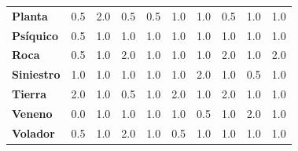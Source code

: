 \documentclass[oneside,11pt]{Latex/Classes/PhDthesisPSnPDF}
\begin{document}
\begin{table}[!h]
{\begin{tabular}[t]{>{}lrrrrrrrrr}
\textbf{Planta} & 0.5 & 2.0 & 0.5 & 0.5 & 1.0 & 1.0 & 0.5 & 1.0 & 1.0\\
\textbf{Psíquico} & 0.5 & 1.0 & 1.0 & 1.0 & 1.0 & 1.0 & 1.0 & 1.0 & 1.0\\
\textbf{Roca} & 0.5 & 1.0 & 2.0 & 1.0 & 1.0 & 1.0 & 2.0 & 1.0 & 2.0\\
\textbf{Siniestro} & 1.0 & 1.0 & 1.0 & 1.0 & 1.0 & 2.0 & 1.0 & 0.5 & 1.0\\
\addlinespace
\textbf{Tierra} & 2.0 & 1.0 & 0.5 & 1.0 & 2.0 & 1.0 & 2.0 & 1.0 & 1.0\\
\textbf{Veneno} & 0.0 & 1.0 & 1.0 & 1.0 & 1.0 & 0.5 & 1.0 & 2.0 & 1.0\\
\textbf{Volador} & 0.5 & 1.0 & 2.0 & 1.0 & 0.5 & 1.0 & 1.0 & 1.0 & 1.0\\
\bottomrule
\end{tabular}}
\end{table}
\end{document}
